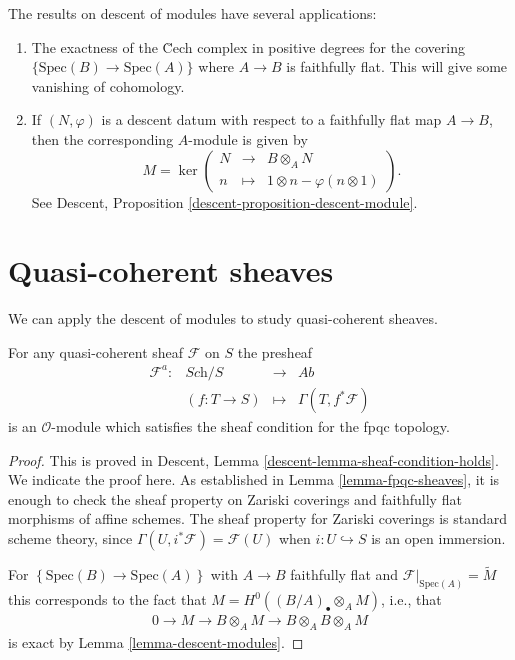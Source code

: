 \begin{remarks}
\label{remarks-theorem-modules-exactness}
The results on descent of modules have several applications:
\begin{enumerate}
\item The exactness of the \u Cech complex in positive degrees for
the covering $\{\text{Spec}(B) \to \text{Spec}(A)\}$ where $A \to B$ is
faithfully flat. This will give some vanishing of cohomology.
\item If $(N,\varphi)$ is a descent datum with respect to a faithfully
flat map $A \to B$, then the corresponding $A$-module is given by
$$
M = \ker \left(
\begin{matrix}
N & \longrightarrow & B\otimes_A N \\
n & \longmapsto & 1 \otimes n - \varphi(n\otimes 1)
\end{matrix}
\right).
$$
See
Descent, Proposition \ref{descent-proposition-descent-module}.
\end{enumerate}
\end{remarks}




\section{Quasi-coherent sheaves}
\label{section-quasi-coherent}

\noindent
We can apply the descent of modules to study quasi-coherent sheaves.

\begin{proposition}
\label{proposition-quasi-coherent-sheaf-fpqc}
For any quasi-coherent sheaf $\mathcal{F}$ on $S$ the presheaf
$$
\begin{matrix}
\mathcal{F}^a : & \textit{Sch}/S & \to & \textit{Ab}\\
& (f: T \to S) &\mapsto & \Gamma(T, f^*\mathcal{F})
\end{matrix}
$$
is an $\mathcal{O}$-module which satisfies the sheaf condition for the
fpqc topology.
\end{proposition}

\begin{proof}
This is proved in
Descent, Lemma \ref{descent-lemma-sheaf-condition-holds}.
We indicate the proof here. As established in
Lemma \ref{lemma-fpqc-sheaves},
it is enough to check the sheaf property
on Zariski coverings and faithfully flat morphisms of affine schemes. The
sheaf property for Zariski coverings is standard scheme theory, since
$\Gamma(U, i^\ast \mathcal{F}) = \mathcal{F}(U)$ when
$i : U \hookrightarrow S$ is an open immersion.

\medskip\noindent
For $\left\{\text{Spec}(B)\to \text{Spec}(A)\right\}$ with $A\to B$ faithfully
flat and
$\mathcal{F}|_{\text{Spec}(A)} = \widetilde{M}$
this corresponds to the fact that
$M = H^0\left((B/A)_\bullet\otimes_AM \right)$, i.e., that
\begin{align*}
0 \to M \to B\otimes_A M \to B\otimes_A B \otimes_A M
\end{align*}
is exact by
Lemma \ref{lemma-descent-modules}.
\end{proof}

